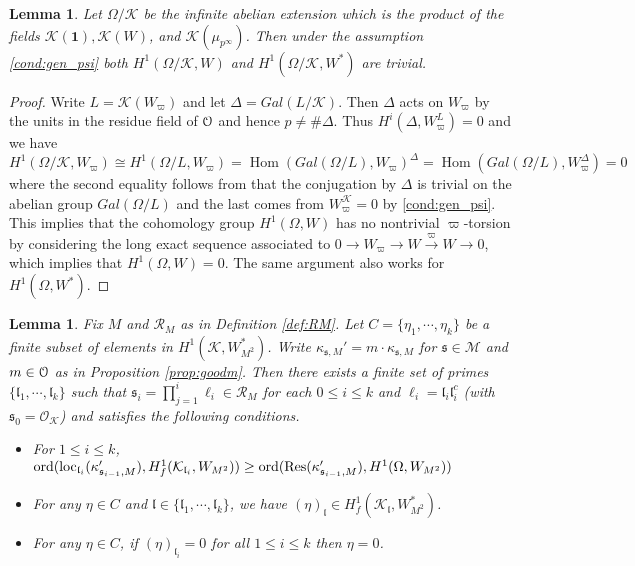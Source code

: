 \documentclass[leqno]{amsart}
\newtheorem{lem}[thm]{Lemma}
\theoremstyle{definition}
\theoremstyle{remark}
\newcommand{\id}{\mathbf{1}}
\newcommand{\oo}{\mathcal{O}}
\newcommand{\eo}{\EuScript{O}}
\DeclareMathOperator{\Hom}{Hom}
\DeclareMathOperator{\Res}{Res}
\newcommand{\fl}{\mathfrak{l}}
\newcommand{\fs}{\mathfrak{s}}
\newcommand{\K}{{\mathcal{K}}} %
\DeclareMathOperator{\loc}{loc}
\begin{document}
\begin{lem}\label{lem:vanish}
    Let $\Omega/\K$ be the infinite abelian extension
    which is the product of the fields
    $\K(\id), \K(W)$, and $\K(\mu_{p^\infty})$.
    Then under the assumption \eqref{cond:gen_psi} both 
    $H^1(\Omega/\K, W)$ and $H^1(\Omega/\K, W^*)$ 
	are trivial.
\end{lem}
\begin{proof}
    Write $L=\K(W_{\varpi})$ and let $\Delta=Gal(L/\K)$.
    Then $\Delta$ acts on $W_{\varpi}$
    by the units in the residue field of $\eo$
    and hence $p\neq \#\Delta$.
    Thus $H^i(\Delta, W_\varpi^L)=0$ and we have
	\[
		H^1(\Omega/\K,W_{\varpi})\cong
		H^1(\Omega/L,W_{\varpi})=
		\Hom(Gal(\Omega/L),W_{\varpi})^\Delta=
		\Hom(Gal(\Omega/L),W_{\varpi}^\Delta)=0
	\]
    where the second equality follows from that
    the conjugation by $\Delta$ 
    is trivial on the abelian group $Gal(\Omega/L)$
    and the last comes from 
    $W_{\varpi}^\K=0$ by \eqref{cond:gen_psi}.
    This implies that the cohomology group 
    $H^1(\Omega,W)$
	has no nontrivial $\varpi$-torsion
    by considering the long exact sequence associated to
	$0\to W_\varpi\to W\xrightarrow{\varpi}W\to 0$,
    which implies that $H^1(\Omega,W)=0$.
	The same argument also works for $H^1(\Omega,W^*)$.
\end{proof}


\begin{lem}\label{lem:dualC}
Fix $M$ and $\mathcal{R}_M$ as in Definition \ref{def:RM}.
Let  $C=\{\eta_1,\cdots,\eta_k\}$
be a finite subset of elements in $H^1(\K,W_{M^2}^*)$.
Write $\kappa_{\fs,M}'=m\cdot \kappa_{\fs,M}$
for $\fs\in \mathcal{M}$ and $m\in \eo$
as in Proposition \ref{prop:goodm}.
Then there exists a finite set of primes
$\{\fl_1,\cdots,\fl_k\}$  such that 
$\fs_i=\prod_{j=1}^i\ell_i\in \mathcal{R}_M$
for each $0\leq i\leq k$ and $\ell_i=\fl_i\fl_i^c$
(with $\fs_0=\oo_\K$) and satisfies the following conditions.
\begin{itemize}
\item For $1\leq i\leq k$,
$\textnormal{ord}( \loc_{\fl_i}(\kappa_{\fs_{i-1},M}'),
H^1_f(\K_{\fl_i}, W_{M^2}))\geq
\textnormal{ord}( \Res(\kappa_{\fs_{i-1},M}'), H^1(\Omega,W_{M^2}))$
\item For any $\eta\in C$ and $\fl\in \{\fl_1,\cdots,\fl_k\}$,
we have $(\eta)_{\fl}\in H^1_f(\K_{\fl},W_{M^2}^*)$.
\item For any $\eta\in C$,
if $(\eta)_{\fl_i}=0$ for all $1\leq i\leq k$ then $\eta=0$.
\end{itemize}

\end{lem}
\end{document}
